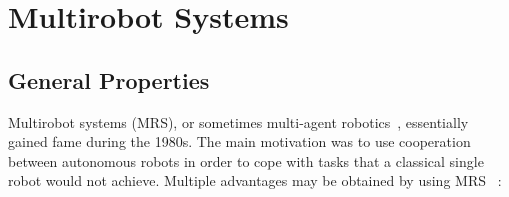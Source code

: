 \section{Multirobot Systems}
\label{sec:MRS}

  






  \subsection{General Properties} 

    Multirobot systems (MRS), or sometimes multi-agent robotics~\parencite{Dudek1996}, essentially gained fame during the 1980s. The main motivation was to use cooperation between autonomous robots in order to cope with tasks that a classical single robot would not achieve. Multiple advantages may be obtained by using MRS~\parencite{Cao1997, Arkin1998} :

